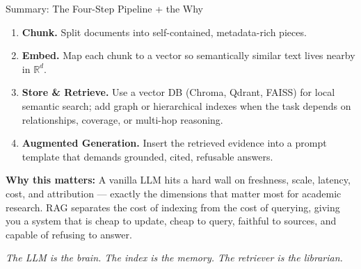 \begin{frame}{Summary: The Four-Step Pipeline + the Why}
\begin{enumerate}
\item \textbf{Chunk.} Split documents into self-contained, metadata-rich pieces.

\medskip
\item \textbf{Embed.} Map each chunk to a vector so semantically similar text lives nearby in $\mathbb{R}^d$.

\medskip
\item \textbf{Store \& Retrieve.} Use a vector DB (Chroma, Qdrant, FAISS) for local semantic search; add graph or hierarchical indexes when the task depends on relationships, coverage, or multi-hop reasoning.

\medskip
\item \textbf{Augmented Generation.} Insert the retrieved evidence into a prompt template that demands grounded, cited, refusable answers.
\end{enumerate}

\bigskip
\textbf{Why this matters:} A vanilla LLM hits a hard wall on freshness, scale, latency, cost, and attribution --- exactly the dimensions that matter most for academic research. RAG separates the cost of indexing from the cost of querying, giving you a system that is cheap to update, cheap to query, faithful to sources, and capable of refusing to answer.

\bigskip
\centering\emph{The LLM is the brain. The index is the memory. The retriever is the librarian.}
\end{frame}

